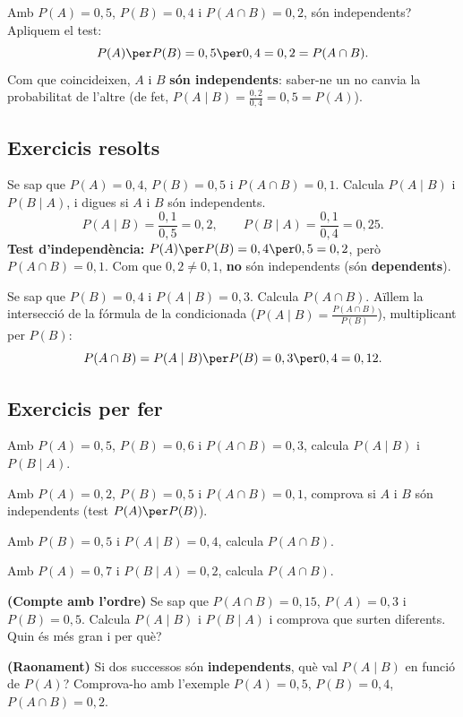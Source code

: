 \begin{exemple}
Amb $P(A)=0,5$, $P(B)=0,4$ i $P(A\cap B)=0,2$, són independents? Apliquem el test:
\[
P(A)\per P(B)=0,5\per 0,4=0,2=P(A\cap B).
\]
Com que coincideixen, $A$ i $B$ \textbf{són independents}: saber-ne un no canvia la
probabilitat de l'altre (de fet, $P(A\mid B)=\frac{0,2}{0,4}=0,5=P(A)$).
\end{exemple}

\subsection{Exercicis resolts}

\begin{exresolt}
Se sap que $P(A)=0,4$, $P(B)=0,5$ i $P(A\cap B)=0,1$. Calcula $P(A\mid B)$ i
$P(B\mid A)$, i digues si $A$ i $B$ són independents.
\solucio
\[
P(A\mid B)=\frac{0,1}{0,5}=0,2,\qquad P(B\mid A)=\frac{0,1}{0,4}=0,25.
\]
\textbf{Test d'independència:} $P(A)\per P(B)=0,4\per 0,5=0,2$, però $P(A\cap B)=0,1$.
Com que $0,2\neq 0,1$, \textbf{no} són independents (són \textbf{dependents}).
\end{exresolt}

\begin{exresolt}
Se sap que $P(B)=0,4$ i $P(A\mid B)=0,3$. Calcula $P(A\cap B)$.
\solucio
Aïllem la intersecció de la fórmula de la condicionada
($P(A\mid B)=\frac{P(A\cap B)}{P(B)}$), multiplicant per $P(B)$:
\[
P(A\cap B)=P(A\mid B)\per P(B)=0,3\per 0,4=0,12.
\]
\end{exresolt}

\subsection{Exercicis per fer}

\begin{exercicis}
\begin{exlist}
  \item Amb $P(A)=0,5$, $P(B)=0,6$ i $P(A\cap B)=0,3$, calcula $P(A\mid B)$ i
        $P(B\mid A)$.
  \item Amb $P(A)=0,2$, $P(B)=0,5$ i $P(A\cap B)=0,1$, comprova si $A$ i $B$ són
        independents (test $P(A)\per P(B)$).
  \item Amb $P(B)=0,5$ i $P(A\mid B)=0,4$, calcula $P(A\cap B)$.
  \item Amb $P(A)=0,7$ i $P(B\mid A)=0,2$, calcula $P(A\cap B)$.
  \item \textbf{(Compte amb l'ordre)} Se sap que $P(A\cap B)=0,15$, $P(A)=0,3$ i
        $P(B)=0,5$. Calcula $P(A\mid B)$ i $P(B\mid A)$ i comprova que surten diferents.
        Quin és més gran i per què?
  \item \textbf{(Raonament)} Si dos successos són \textbf{independents}, què val
        $P(A\mid B)$ en funció de $P(A)$? Comprova-ho amb l'exemple
        $P(A)=0,5$, $P(B)=0,4$, $P(A\cap B)=0,2$.
\end{exlist}
\end{exercicis}

